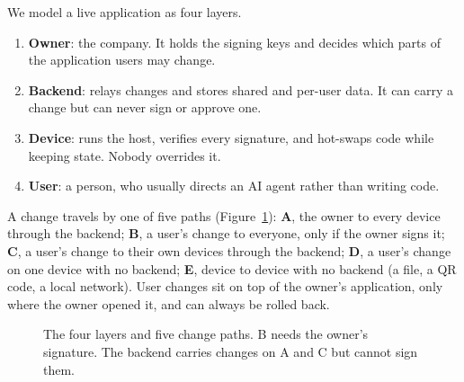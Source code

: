 \documentclass[10pt,twocolumn]{article}
\begin{document}
We model a live application as four layers.
\begin{enumerate}
\item \textbf{Owner}: the company. It holds the signing keys and decides which parts of the
application users may change.
\item \textbf{Backend}: relays changes and stores shared and per-user data. It can carry a change
but can never sign or approve one.
\item \textbf{Device}: runs the host, verifies every signature, and hot-swaps code while keeping
state. Nobody overrides it.
\item \textbf{User}: a person, who usually directs an AI agent rather than writing code.
\end{enumerate}
A change travels by one of five paths (Figure~\ref{fig:paths}): \textbf{A}, the owner to every
device through the backend; \textbf{B}, a user's change to everyone, only if the owner signs it;
\textbf{C}, a user's change to their own devices through the backend; \textbf{D}, a user's change on
one device with no backend; \textbf{E}, device to device with no backend (a file, a QR code, a local
network). User changes sit on top of the owner's application, only where the owner opened it, and
can always be rolled back.

\begin{figure}[t]
\centering
{}
\caption{The four layers and five change paths. B needs the owner's signature. The backend carries
changes on A and C but cannot sign them.}
\label{fig:paths}
\end{figure}
\end{document}
